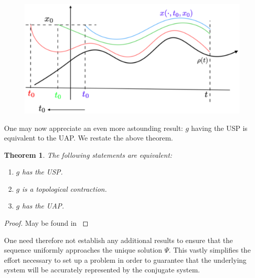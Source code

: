 \documentclass[a4paper,12pt,twoside]{report}
\newtheorem{Theorem}{Theorem}[]
\begin{document}
\begin{figure}[ht]
  \includegraphics[scale=0.4]{_memloss_conttime.eps}
  \centering
{}
\label{fig:memloss_conttime} 
\end{figure}

One may now appreciate an even more astounding result: $g$ having the USP is equivalent to the UAP. We restate the above theorem.

\begin{Theorem}\label{thm_usp-contr-uap}
  The following statements are equivalent:
  \vspace{-8mm}
  \begin{enumerate}[noitemsep, label=\roman*.]
    \item $g$ has the USP.
    \item $g$ is a topological contraction.
    \item $g$ has the UAP.
  \end{enumerate}
\end{Theorem}
\begin{proof}
  May be found in \cite[Th.1]{Manju_Nonlinearity}
\end{proof}

One need therefore not establish any additional results to ensure that the sequence uniformly approaches the unique solution $\Psi$. This vastly simplifies the effort necessary to set up a problem in order to guarantee that the underlying system will be accurately represented by the conjugate system.
\end{document}
